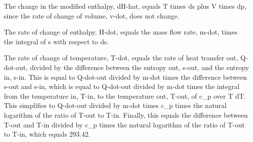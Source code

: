 The change in the modified enthalpy, dH-hat, equals T times ds plus V times dp, since the rate of change of volume, v-dot, does not change.

The rate of change of enthalpy, H-dot, equals the mass flow rate, m-dot, times the integral of s with respect to ds.

The rate of change of temperature, T-dot, equals the rate of heat transfer out, Q-dot-out, divided by the difference between the entropy out, s-out, and the entropy in, s-in. This is equal to Q-dot-out divided by m-dot times the difference between s-out and s-in, which is equal to Q-dot-out divided by m-dot times the integral from the temperature in, T-in, to the temperature out, T-out, of c_p over T dT. This simplifies to Q-dot-out divided by m-dot times c_p times the natural logarithm of the ratio of T-out to T-in. Finally, this equals the difference between T-out and T-in divided by c_p times the natural logarithm of the ratio of T-out to T-in, which equals 293.42.